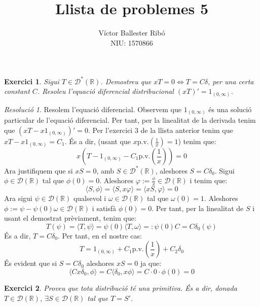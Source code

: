 \documentclass[10pt,a4paper]{article}
\title{\bfseries\Large Llista de problemes 5}
\author{Víctor Ballester Ribó\\NIU: 1570866}
\date{\parbox{\linewidth}{\centering
  Anàlisi Harmònica\endgraf
  Grau en Matemàtiques\endgraf
  Universitat Autònoma de Barcelona\endgraf
  Abril de 2023}}
\newcommand{\RR}{\ensuremath{\mathbb{R}}} %
\newcommand{\vf}[1]{\boldsymbol{\mathrm{#1}}} %
\newtheorem{exercici}{Exercici}
\theoremstyle{definition}
\theoremstyle{remark}
\newtheorem*{res}{Resolució}
\renewcommand{\pv}{\mathrm{p.v.}} %
\begin{document}
\maketitle
\begin{exercici}
  Sigui $T\in \mathcal{D}^*(\RR)$. Demostreu que $xT=0\iff T=C\delta$, per una certa constant $C$. Resoleu l'equació diferencial distribucional ${(xT)}'=\vf{1}_{(0,\infty)}$.
\end{exercici}
\begin{res}
  Resolem l'equació diferencial. Observem que $\vf{1}_{(0,\infty)}$ és una solució particular de l'equació diferencial. Per tant, per la linealitat de la derivada tenim que ${(xT - x\vf{1}_{(0,\infty)})}'=0$. Per l'exercici 3 de la llista anterior tenim que $xT - x\vf{1}_{(0,\infty)}=C_1$. És a dir, (usant que $x\pv\left(\frac{1}{x}\right)=1$) tenim que:
  $$
    x\left(T-\vf{1}_{(0,\infty)}-C_1\pv\left(\frac{1}{x}\right)\right)=0
  $$
  Ara justifiquem que si $xS=0$, amb $S\in\mathcal{D}^*(\RR)$, aleshores $S=C\delta_0$. Sigui $\phi\in\mathcal{D}(\RR)$ tal que $\phi(0)=0$. Aleshores $\varphi:=\frac{\phi}{x}\in\mathcal{D}(\RR)$ i tenim que:
  $$\langle S,\phi\rangle=\langle S,x\varphi\rangle=\langle xS,\varphi\rangle=0$$
  Ara sigui $\psi\in\mathcal{D}(\RR)$ qualsevol i $\omega\in \mathcal{D}(\RR)$ tal que $\omega(0)=1$. Aleshores $\phi:=\psi-\psi(0)\omega\in\mathcal{D}(\RR)$ i satisfà $\phi(0)=0$. Per tant, per la linealitat de $S$ i usant el demostrat prèviament, tenim que:
  $$
    T(\psi)=\langle T,\psi \rangle =\psi(0) \langle T,\omega \rangle =: \psi(0) C=C\delta_0(\psi)
  $$
  És a dir, $T=C\delta_0$. Per tant, en el nostre cas:
  $$
    T=\vf{1}_{(0,\infty)}+C_1\pv\left(\frac{1}{x}\right)+C_2\delta_0
  $$
  És evident que si $S=C\delta_0$ aleshores $xS=0$ ja que:
  $$
    \langle Cx\delta_0,\phi\rangle = C\langle \delta_0,x\phi\rangle = C\cdot0\cdot\phi(0)=0
  $$
\end{res}
\begin{exercici}
  Proveu que tota distribució té una primitiva. És a dir, donada $T\in\mathcal{D}(\RR)$, $\exists S\in\mathcal{D}(\RR)$ tal que $T=S'$.
\end{exercici}
\end{document}

